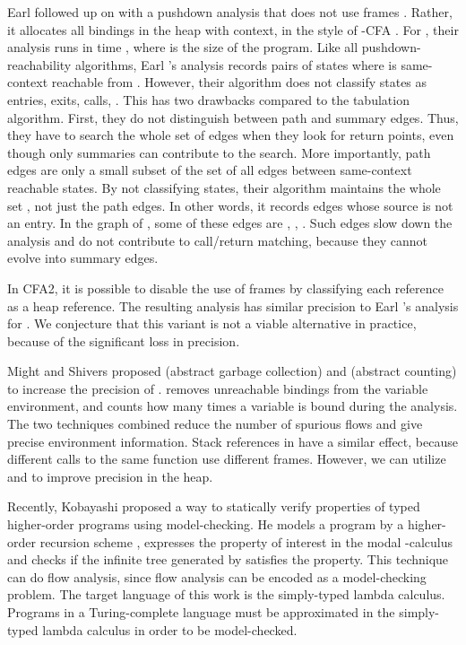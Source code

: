 \documentclass{LMCS}
\theoremstyle{definition} \newtheorem{property}[thm]{Property}
\begin{document}
Earl \etal{} followed up on \cfat{} with a pushdown analysis that does not use 
frames \cite{conf/sfp/10/earl/pdcfa}.
Rather, it allocates all bindings in the heap with context, in the style of 
-CFA \cite{diss/cmu/91/olin}.
For , their analysis runs in time , where  is the size of the
program.
Like all pushdown-reachability algorithms, Earl \etal's analysis records pairs
of states  where \cstatw{} is same-context reachable from
\cstato.
However, their algorithm does not classify states as entries, exits, calls, 
\etc.
This has two drawbacks compared to the tabulation algorithm.
First, they do not distinguish between path and summary edges.
Thus, they have to search the whole set of edges when they look for return 
points, even though only summaries can contribute to the search.
More importantly, path edges are only a small subset of the set  of all edges
between same-context reachable states.
By not classifying states, their algorithm maintains the whole set , not just
the path edges.
In other words, it records edges whose source is not an entry.
In the graph of , some of these edges are , , 
.
Such edges slow down the analysis and do not contribute to call/return matching,
because they cannot evolve into summary edges.

In CFA2, it is possible to disable the use of frames by classifying each 
reference as a heap reference.
The resulting analysis has similar precision to Earl \etal's analysis for .
We conjecture that this variant is not a viable alternative in practice, because
of the significant loss in precision.

Might and Shivers \cite{conf/icfp/06/might/gcfa} proposed 
\cfa{\Gamma} (abstract garbage collection) and \cfa{\mu} (abstract counting) 
to increase the precision of \kcfa.
\cfa{\Gamma} removes unreachable bindings from the variable environment,
and \cfa{\mu} counts how many times a variable is bound during the analysis.
The two techniques combined reduce the number of spurious flows and give precise
environment information.
Stack references in \cfat{} have a similar effect, because different calls to 
the same function use different frames.
However, we can utilize \cfa{\Gamma} and \cfa{\mu} to improve precision in the
heap.

Recently, Kobayashi \cite{conf/popl/09/kobayashi/hors} proposed a way to 
statically verify properties of typed higher-order programs using 
model-checking.
He models a program by a higher-order recursion scheme ,
expresses the property of interest in the modal -calculus
and checks if the infinite tree generated by  satisfies the 
property.
This technique can do flow analysis, since flow analysis can be encoded as a 
model-checking problem.
The target language of this work is the simply-typed lambda calculus.
Programs in a Turing-complete language must be approximated in the simply-typed
lambda calculus in order to be model-checked.
\end{document}
